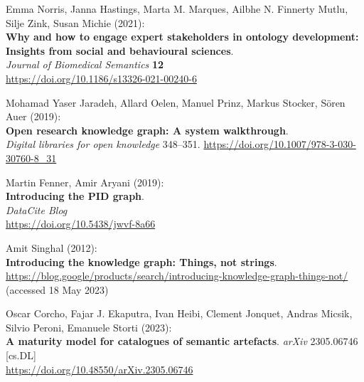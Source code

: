 \begin{thebibliography}{9}
Emma Norris, Janna Hastings, Marta M. Marques, Ailbhe N. Finnerty Mutlu,
Silje Zink, Susan Michie (2021): \\
\textbf{Why and how to engage expert
stakeholders in ontology development: Insights from social and
behavioural sciences}. \\
\emph{Journal of Biomedical Semantics} \textbf{12} \\
\url{https://doi.org/10.1186/s13326-021-00240-6}

Mohamad Yaser Jaradeh, Allard Oelen, Manuel Prinz, Markus Stocker, Sören Auer (2019): \\
\textbf{Open research knowledge graph: A system walkthrough}. \\
\emph{Digital libraries for open knowledge} 348--351.
\url{https://doi.org/10.1007/978-3-030-30760-8_31}

Martin Fenner, Amir Aryani (2019): \\
\textbf{Introducing the PID graph}. \\
\emph{DataCite Blog}\\
\url{https://doi.org/10.5438/jwvf-8a66}

Amit Singhal (2012): \\
\textbf{Introducing the knowledge graph: Things, not strings}.
\url{https://blog.google/products/search/introducing-knowledge-graph-things-not/}
(accessed 18 May 2023)

Oscar Corcho, Fajar J. Ekaputra, Ivan Heibi, Clement Jonquet, Andras
Micsik, Silvio Peroni, Emanuele Storti (2023): \\
\textbf{A maturity model for catalogues of semantic artefacts}. 
\emph{arXiv} 2305.06746 [cs.DL] \\
\url{https://doi.org/10.48550/arXiv.2305.06746}


\end{thebibliography}
